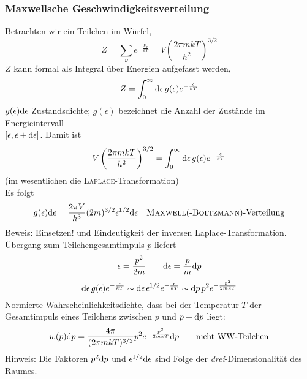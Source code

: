 \subsubsection{Maxwellsche Geschwindigkeitsverteilung}
Betrachten wir ein Teilchen im Würfel,
\begin{equation}
    Z = \sum_\nu e^{- \frac{E_\nu}{k T}} = V \left( \frac{2 \pi m k T}{h^2} \right)^{3/2}
\end{equation}
$Z$ kann formal als Integral über Energien aufgefasst werden,
\begin{equation}
    Z = \int_{0}^{\infty} \mathrm{d} \epsilon\, g(\epsilon) e^{- \frac{\epsilon}{kT}}
\end{equation}
$g(\epsilon)\mathrm{d} \epsilon$ Zustandsdichte; $g(\epsilon)$ bezeichnet die Anzahl der Zustände im
Energieintervall \\ $[\epsilon, \epsilon + \mathrm{d} \epsilon]$. Damit ist
\begin{equation}
    V \left( \frac{2 \pi m k T}{h^2} \right)^{3/2} = \int_{0}^{\infty} \mathrm{d} \epsilon\, g(\epsilon) e^{-\frac{\epsilon}{k T}}
\end{equation}
(im wesentlichen die \textsc{Laplace}-Transformation) \\
Es folgt
\begin{equation}
    g(\epsilon) \mathrm{d} \epsilon = \frac{2 \pi V}{h^3} (2m)^{3/2} \epsilon^{1/2} \mathrm{d} \epsilon \quad \text{\textsc{Maxwell}(-\textsc{Boltzmann})-Verteilung}
\end{equation}
Beweis: Einsetzen! und Eindeutigkeit der inversen Laplace-Transformation.\\
Übergang zum Teilchengesamtimpuls $p$ liefert
\begin{equation}
    \epsilon = \frac{p^2}{2 m} \qquad \mathrm{d} \epsilon = \frac{p}{m} \mathrm{d} p
\end{equation}
\begin{equation}
    \mathrm{d} \epsilon\, g(\epsilon) e^{-\frac{\epsilon}{k T}} \sim \mathrm{d} \epsilon\, \epsilon^{1/2} e^{-\frac{\epsilon}{k T}} \sim \mathrm{d} p\, p^2 e^{-\frac{p^2}{2 m k T}}
\end{equation}
Normierte Wahrscheinlichkeitsdichte, dass bei der Temperatur $T$ der Gesamtimpuls eines Teilchens zwischen $p$ und $p+\mathrm{d} p$ liegt:
\begin{equation}
    w(p)\mathrm{d} p = \frac{4 \pi}{(2 \pi m k T)^{3/2}} p^2 e^{- \frac{p^2}{2 m k T}} \mathrm{d} p \qquad \text{nicht WW-Teilchen}
\end{equation}
Hinweis: Die Faktoren $p^2 \mathrm{d} p$ und $\epsilon^{1/2} \mathrm{d} \epsilon$ sind Folge der \emph{drei}-Dimensionalität des Raumes.

